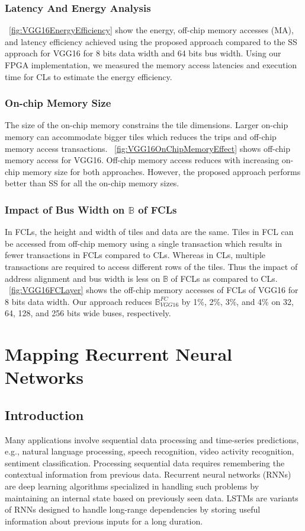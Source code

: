 \documentclass[a4paper,10pt]{article}
\newcommand{\numBytesOffChip}{\mathbb{B}}
\begin{document}
\subsubsection{Latency And Energy Analysis}
\figurename{~\ref{fig:VGG16EnergyEfficiency}} show the energy, off-chip memory accesses (MA), and latency efficiency achieved using the proposed approach compared to the SS approach for VGG16 for 8 bits data width and 64 bits bus width. Using our FPGA implementation, we measured the memory access latencies and execution time for CLs to estimate the energy efficiency.
\subsubsection{On-chip Memory Size}
The size of the on-chip memory constrains the tile dimensions. Larger on-chip memory can accommodate bigger tiles which reduces the trips and off-chip memory access transactions. \figurename{~\ref{fig:VGG16OnChipMemoryEffect}} shows off-chip memory access for VGG16. Off-chip memory access reduces with increasing on-chip memory size for both approaches. However, the proposed approach performs better than SS for all the on-chip memory sizes.
\subsubsection{Impact of Bus Width on $\numBytesOffChip$ of FCLs}
In FCLs, the height and width of tiles and data are the same. Tiles in FCL can be accessed from off-chip memory using a single transaction which results in fewer transactions in FCLs compared to CLs. Whereas in CLs, multiple transactions are required to access different rows of the tiles. Thus the impact of address alignment and bus width is less on $\numBytesOffChip$ of FCLs as compared to CLs. \figurename~\ref{fig:VGG16FCLayer} shows the off-chip memory accesses of FCLs of VGG16 for 8 bits data width. Our approach reduces $\numBytesOffChip_{VGG16}^{FC}$ by 1\%, 2\%, 3\%, and 4\% on 32, 64, 128, and 256 bits wide buses, respectively. 

\section{Mapping Recurrent Neural Networks}
\subsection{Introduction}
Many applications involve sequential data processing and time-series predictions, e.g., natural language processing, speech recognition, video activity recognition, sentiment classification. Processing sequential data requires remembering the contextual information from previous data. Recurrent neural networks (RNNs) are deep learning algorithms specialized in handling such problems by maintaining an internal state based on previously seen data. LSTMs \cite{hochreiter1997long} are variants of RNNs designed to handle long-range dependencies by storing useful information about previous inputs for a long duration. 
\end{document}
